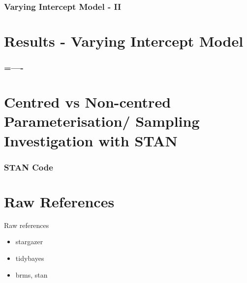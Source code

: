 \documentclass{beamer}
\begin{document}
\begin{frame}
  \frametitle{Varying Intercept Model - II}%
  
\end{frame}



\section{Results - Varying Intercept Model}

\begin{frame}
\frametitle{=----}

\end{frame}

\section{Centred vs Non-centred Parameterisation/ Sampling Investigation with STAN}

\begin{frame}
\frametitle{STAN Code}

\end{frame}

\section{Raw References}

\begin{frame}{Raw references}
    \begin{itemize}
        \item stargazer
        \item tidybayes
        \item brms, stan
    \end{itemize}
\end{frame}
\end{document}
